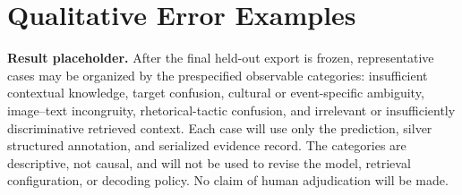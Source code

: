 \section{Qualitative Error Examples}
\label{sec:supp:error-cases}

\textbf{Result placeholder.}  After the final held-out export is frozen,
representative cases may be organized by the prespecified observable
categories: insufficient contextual knowledge, target confusion, cultural or
event-specific ambiguity, image--text incongruity, rhetorical-tactic
confusion, and irrelevant or insufficiently discriminative retrieved context.
Each case will use only the prediction, silver structured annotation, and
serialized evidence record.  The categories are descriptive, not causal, and
will not be used to revise the model, retrieval configuration, or decoding
policy.  No claim of human adjudication will be made.
